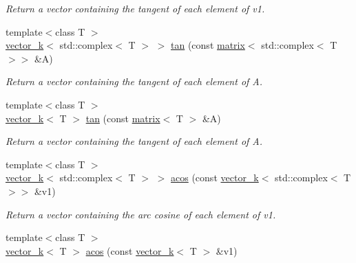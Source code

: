 \begin{DoxyCompactItemize}
\begin{DoxyCompactList}\small\item\em Return a vector containing the tangent of each element of v1. \end{DoxyCompactList}\item 
\hypertarget{namespacekeycpp_abae345d963258d8db3de7630a21f7231}{{\footnotesize template$<$class T $>$ }\\\hyperlink{classkeycpp_1_1vector__k}{vector\-\_\-k}$<$ std\-::complex$<$ T $>$ $>$ \hyperlink{namespacekeycpp_abae345d963258d8db3de7630a21f7231}{tan} (const \hyperlink{classkeycpp_1_1matrix}{matrix}$<$ std\-::complex$<$ T $>$$>$ \&A)}\label{namespacekeycpp_abae345d963258d8db3de7630a21f7231}

\begin{DoxyCompactList}\small\item\em Return a vector containing the tangent of each element of A. \end{DoxyCompactList}\item 
\hypertarget{namespacekeycpp_a7310a65b84d58bffa91cd81d14fbf81a}{{\footnotesize template$<$class T $>$ }\\\hyperlink{classkeycpp_1_1vector__k}{vector\-\_\-k}$<$ T $>$ \hyperlink{namespacekeycpp_a7310a65b84d58bffa91cd81d14fbf81a}{tan} (const \hyperlink{classkeycpp_1_1matrix}{matrix}$<$ T $>$ \&A)}\label{namespacekeycpp_a7310a65b84d58bffa91cd81d14fbf81a}

\begin{DoxyCompactList}\small\item\em Return a vector containing the tangent of each element of A. \end{DoxyCompactList}\item 
\hypertarget{namespacekeycpp_a877d94927f5459e9cdaa50c11e8ffd3c}{{\footnotesize template$<$class T $>$ }\\\hyperlink{classkeycpp_1_1vector__k}{vector\-\_\-k}$<$ std\-::complex$<$ T $>$ $>$ \hyperlink{namespacekeycpp_a877d94927f5459e9cdaa50c11e8ffd3c}{acos} (const \hyperlink{classkeycpp_1_1vector__k}{vector\-\_\-k}$<$ std\-::complex$<$ T $>$$>$ \&v1)}\label{namespacekeycpp_a877d94927f5459e9cdaa50c11e8ffd3c}

\begin{DoxyCompactList}\small\item\em Return a vector containing the arc cosine of each element of v1. \end{DoxyCompactList}\item 
\hypertarget{namespacekeycpp_a1c98db9af87a464e8258138f98d9c029}{{\footnotesize template$<$class T $>$ }\\\hyperlink{classkeycpp_1_1vector__k}{vector\-\_\-k}$<$ T $>$ \hyperlink{namespacekeycpp_a1c98db9af87a464e8258138f98d9c029}{acos} (const \hyperlink{classkeycpp_1_1vector__k}{vector\-\_\-k}$<$ T $>$ \&v1)}\label{namespacekeycpp_a1c98db9af87a464e8258138f98d9c029}


\end{DoxyCompactItemize}
